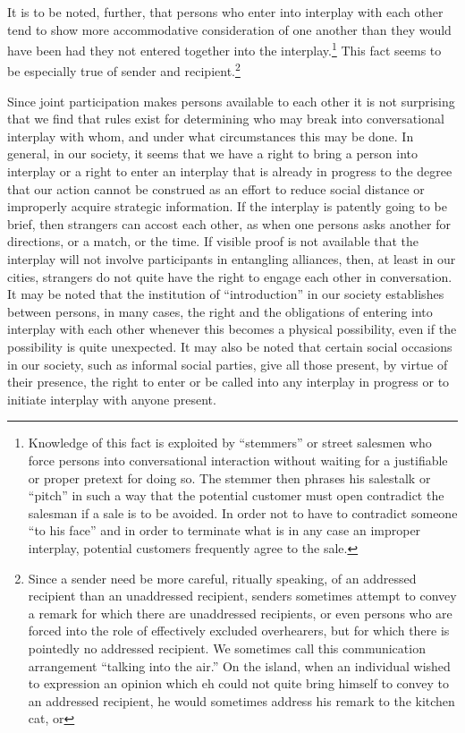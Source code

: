 \documentclass[twoside,symmetric,nobib,justified]{tufte-book}
\begin{document}
It is to be noted, further, that persons who enter into interplay with
each other tend to show more accommodative consideration of one another
than they would have been had they not entered together into the
interplay.\footnote{Knowledge of this fact is exploited by ``stemmers''
  or street salesmen who force persons into conversational interaction
  without waiting for a justifiable or proper pretext for doing so. The
  stemmer then phrases his salestalk or ``pitch'' in such a way that the
  potential customer must open contradict the salesman if a sale is to
  be avoided. In order not to have to contradict someone ``to his face''
  and in order to terminate what is in any case an improper interplay,
  potential customers frequently agree to the sale.} This fact seems to
be especially true of sender and recipient.\footnote{Since a sender
  need be more careful, ritually speaking, of an addressed recipient
  than an unaddressed recipient, senders sometimes attempt to convey a
  remark for which there are unaddressed recipients, or even persons who
  are forced into the role of effectively excluded overhearers, but for
  which there is pointedly no addressed recipient. We sometimes call
  this communication arrangement ``talking into the air.'' On the
  island, when an individual wished to expression an opinion which eh
  could not quite bring himself to convey to an addressed recipient, he
  would sometimes address his remark to the kitchen cat, or}

Since joint participation makes persons available to each other it is
not surprising that we find that rules exist for determining who may
break into conversational interplay with whom, and under what
circumstances this may be done. In general, in our society, it seems
that we have a right to bring a person into interplay or a right to
enter an interplay that is already in progress to the degree that our
action cannot be construed as an effort to reduce social distance or
improperly acquire strategic information. If the interplay is patently
going to be brief, then strangers can accost each other, as when one
persons asks another for directions, or a match, or the time. If visible
proof is not available that the interplay will not involve participants
in entangling alliances, then, at least in our cities, strangers do not
quite have the right to engage each other in conversation. It may be
noted that the institution of ``introduction'' in our society
establishes between persons, in many cases, the right and the
obligations of entering into interplay with each other whenever this
becomes a physical possibility, even if the possibility is quite
unexpected. It may also be noted that certain social occasions in our
society, such as informal social parties, give all those present, by
virtue of their presence, the right to enter or be called into any
interplay in progress or to initiate interplay with anyone present.
\end{document}
